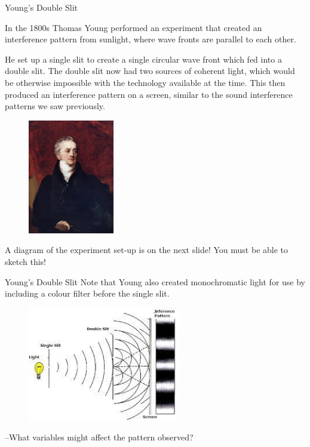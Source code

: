 \documentclass[../Main.tex]{subfiles}
\begin{document}
\begin{frame}{Young's Double Slit}
\begin{multicols}{2}
    In the 1800s Thomas Young performed an experiment that created an interference pattern from sunlight, where wave fronts are parallel to each other. 
    \newline
    
    He set up a single slit to create a single circular wave front which fed into a double slit. The double slit now had two sources of coherent light, which would be otherwise impossible with the technology available at the time. This then produced an interference pattern on a screen, similar to the sound interference patterns we saw previously.
    \columnbreak
    \begin{figure}
        \centering
        \includegraphics[height=5cm]{Waves_Images/thomasyoung.png}
    \end{figure}
   A diagram of the experiment set-up is on the next slide! You must be able to sketch this!
\end{multicols}
\end{frame}

\begin{frame}{Young's Double Slit}
Note that Young also created monochromatic light for use by including a colour filter before the single slit.
     \begin{figure}
        \centering
        \includegraphics[height=5cm]{Waves_Images/doubleslit.png}
    \end{figure}
    --What variables might affect the pattern observed?
\end{frame}
\end{document}
